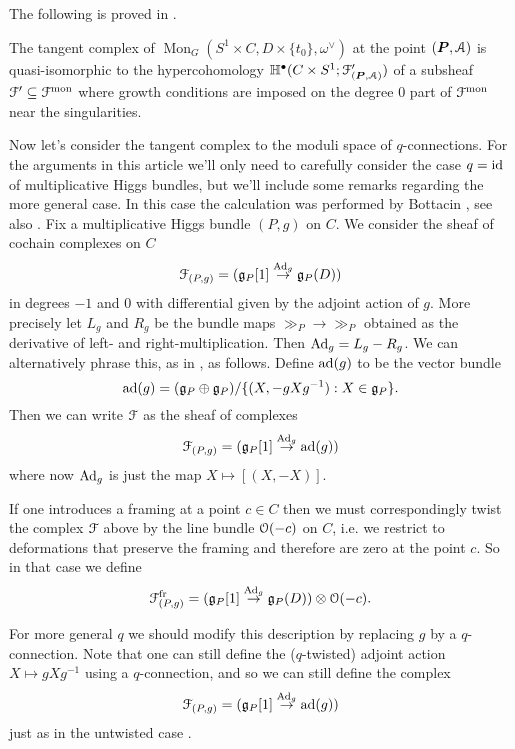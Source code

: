 \documentclass[10pt, oneside]{article}
\DeclareMathOperator{\mon}{Mon}
\newcommand{\fr}{\mathrm{fr}}
\renewcommand{\ad}{\mr{ad}}
\newcommand{\Ad}{\mr{Ad}}
\begin{document}
The following is proved in \cite{FoscoloDef}.
 
\begin{prop}
The tangent complex of $\mon_G(S^1 \times C, D \times \{t_0\}, \omega^\vee)$ at the point $(\boldsymbol{P},\mathcal{A})$ is quasi-isomorphic to the hypercohomology $\mathbb{H}^\bullet(C \times S^1; \mathcal{F}'_{(\boldsymbol{P},\mathcal{A})})$ of a subsheaf $\mathcal{F}' \subseteq \mathcal{F}^{\mathrm{mon}}$ where growth conditions are imposed on the degree 0 part of $\mathcal{F}^{\mathrm{mon}}$ near the singularities.
\end{prop}

Now let's consider the tangent complex to the moduli space of $q$-connections.  For the arguments in this article we'll only need to carefully consider the case $q=\operatorname{id}$ of multiplicative Higgs bundles, but we'll include some remarks regarding the more general case.  In this case the calculation was performed by Bottacin \cite{Bottacin}, see also \cite[Section 4]{HurtubiseMarkman}. Fix a multiplicative Higgs bundle $(P,g)$ on $C$.  We consider the sheaf of cochain complexes on $C$
\[\mc F_{(P,g)} = (\gg_P[1] \overset {\Ad_g} {\to} \gg_P(D))\]
in degrees $-1$ and 0 with differential given by the adjoint action of $g$.  More precisely let $L_g$ and $R_g$ be the bundle maps $\gg_P \to \gg_P$ obtained as the derivative of left- and right-multiplication.  Then $\Ad_g = L_g - R_g$.  We can alternatively phrase this, as in \cite[Section 4]{HurtubiseMarkman}, as follows.  Define $\ad(g)$ to be the vector bundle
\[\ad(g) = (\gg_P \oplus \gg_P)/\{(X, -g X g^{-1}): X \in \gg_P\}.\]
Then we can write $\mathcal{F}$ as the sheaf of complexes
\[\mc F_{(P,g)} = (\gg_P[1] \overset {\Ad_g} {\to} \ad(g))\]
where now $\Ad_g$ is just the map $X \mapsto [(X,-X)]$.

\begin{remark}
  If one introduces a framing at a point $c \in C$ then we must correspondingly twist the complex $\mathcal{F}$ above by the line bundle $\mathcal{O}(-c)$ on $C$, i.e. we restrict to deformations that preserve the framing and therefore are zero at the point $c$.  So in that case we define
\[\mc F^\fr_{(P,g)} = (\gg_P[1] \overset {\Ad_g} {\to} \gg_P(D)) \otimes \OO(-c).\]
\end{remark}

\begin{remark}
For more general $q$ we should modify this description by replacing $g$ by a $q$-connection.  Note that one can still define the ($q$-twisted) adjoint action $X \mapsto g X g^{-1}$ using a $q$-connection, and so we can still define the complex
\[\mc F_{(P,g)} = (\gg_P[1] \overset {\Ad_g} {\to} \ad(g))\]
just as in the untwisted case .
\end{remark}
\end{document}

